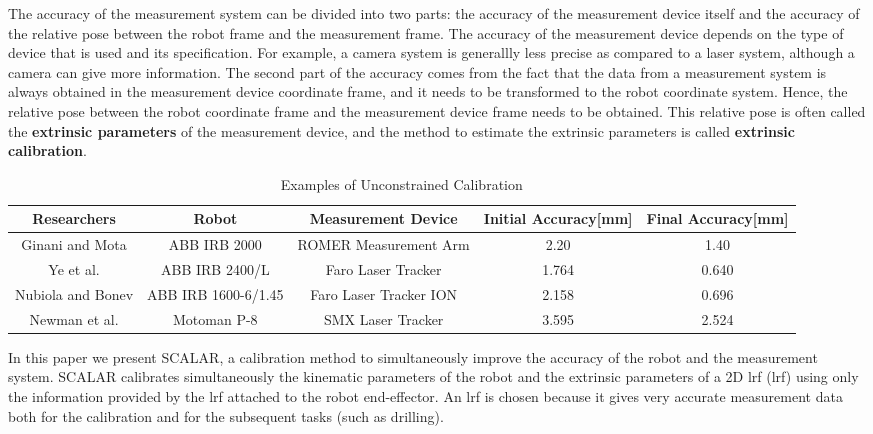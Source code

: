 The accuracy of the measurement system can be divided into two parts: the accuracy of the measurement device itself and the accuracy of the relative pose between the robot frame and the measurement frame. The accuracy of the measurement device depends on the type of device that is used and its specification. For example, a camera system is generallly less precise as compared to a laser system, although a camera can give more information. The second part of the accuracy comes from the fact that the data from a measurement system is always obtained in the measurement device coordinate frame, and it needs to be transformed to the robot coordinate system. Hence, the relative pose between the robot coordinate frame and the measurement device frame needs to be obtained. This relative pose is often called the \textbf{extrinsic parameters} of the measurement device, and the method to estimate the extrinsic parameters is called \textbf{extrinsic calibration}.  


\renewcommand{\arraystretch}{1.3}
\begin{table*}[htp]
\caption{Examples of Unconstrained Calibration}
\label{tab:unconstrained_calib}
\centering
\begin{tabular}{c c c c c}
\toprule
\textbf{Researchers} &  \textbf{Robot} & \textbf{Measurement Device} &  \textbf{Initial Accuracy[mm]}  & \textbf{Final Accuracy[mm]}\\
\midrule
Ginani and Mota \cite{Ginani2011} & ABB IRB 2000 & ROMER Measurement Arm & 2.20 & 1.40 \\
Ye et al. \cite{Ye2006} & ABB IRB 2400/L & Faro Laser Tracker & 1.764 & 0.640 \\
Nubiola and Bonev \cite{Nubiola2013} & ABB IRB 1600-6/1.45 & Faro Laser Tracker ION & 2.158 & 0.696 \\ 
Newman et al. \cite{Newman2000} & Motoman P-8 & SMX Laser Tracker & 3.595 & 2.524\\
\bottomrule
\end{tabular}
\end{table*}



In this paper we present SCALAR, a calibration method to simultaneously improve the accuracy of the robot and the measurement system. SCALAR calibrates simultaneously the kinematic parameters of the robot and the extrinsic parameters of a 2D \acl{lrf} (\ac{lrf}) using only the information provided by the \ac{lrf} attached to the robot end-effector. An \ac{lrf} is chosen because it gives very accurate measurement data both for the calibration and for the subsequent tasks (such as drilling).  

